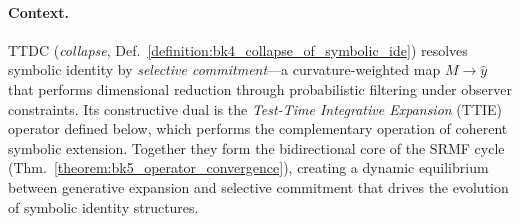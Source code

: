 \paragraph{Context.}
TTDC (\emph{collapse}, Def.~\ref{definition:bk4_collapse_of_symbolic_ide}) resolves symbolic identity by \emph{selective commitment}—a curvature-weighted map $M\!\to\!\widehat{y}$ that performs dimensional reduction through probabilistic filtering under observer constraints. Its constructive dual is the \emph{Test-Time Integrative Expansion} (TTIE) operator defined below, which performs the complementary operation of coherent symbolic extension. Together they form the bidirectional core of the SRMF cycle (Thm.~\ref{theorem:bk5_operator_convergence}), creating a dynamic equilibrium between generative expansion and selective commitment that drives the evolution of symbolic identity structures.

